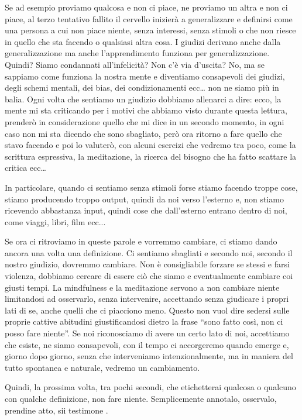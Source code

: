 \documentclass[12pt]{book} %
\begin{document}
Se ad esempio proviamo qualcosa e non ci piace, ne proviamo un altra e non ci piace, al terzo tentativo fallito il
cervello inizierà a generalizzare e definirsi come una persona a cui non piace niente, senza interessi, senza stimoli o
che non riesce in quello che sta facendo o qualsiasi altra cosa. I giudizi derivano anche dalla generalizzazione ma
anche l'apprendimento funziona per generalizzazione. Quindi? Siamo condannati
all'infelicità? Non c'è via d'uscita? No, ma se sappiamo
come funziona la nostra mente e diventiamo consapevoli dei giudizi, degli schemi mentali, dei bias, dei condizionamenti
ecc… non ne siamo più in balia. Ogni volta che sentiamo un giudizio dobbiamo allenarci a dire: ecco, la mente mi sta
criticando per i motivi che abbiamo visto durante questa lettura, prenderò in considerazione quello che mi dice in un
secondo momento, in ogni caso non mi sta dicendo che sono sbagliato, però ora ritorno a fare quello che stavo facendo e
poi lo valuterò, con alcuni esercizi che vedremo tra poco, come la scrittura espressiva, la meditazione, la ricerca del
bisogno che ha fatto scattare la critica ecc…

In particolare, quando ci sentiamo senza stimoli forse stiamo facendo troppe cose, stiamo producendo troppo output,
quindi da noi verso l'esterno e, non stiamo ricevendo abbastanza input, quindi cose che
dall'esterno entrano dentro di noi, come viaggi, libri, film ecc... 

Se ora ci ritroviamo in queste parole e vorremmo cambiare, ci stiamo dando ancora una volta una definizione. Ci sentiamo
sbagliati e secondo noi, secondo il nostro giudizio, dovremmo cambiare. Non è consigliabile forzare se stessi e farsi
violenza, dobbiamo cercare di essere ciò che siamo e eventualmente cambiare coi giusti tempi. La mindfulness e la
meditazione servono a non cambiare niente limitandosi ad osservarlo, senza intervenire, accettando senza giudicare i
propri lati di se, anche quelli che ci piacciono meno. Questo non vuol dire sedersi sulle proprie cattive abitudini
giustificandosi dietro la frase “sono fatto così, non ci posso fare niente”. Se noi riconosciamo di avere un certo lato
di noi, accettiamo che esiste, ne siamo consapevoli, con il tempo ci accorgeremo quando emerge e, giorno dopo giorno,
senza che interveniamo intenzionalmente, ma in maniera del tutto spontanea e naturale, vedremo un cambiamento.

Quindi, la prossima volta, tra pochi secondi, che etichetterai qualcosa o qualcuno con qualche definizione, non fare
niente. Semplicemente annotalo, osservalo, prendine atto, sii
testimone
.
\end{document}
